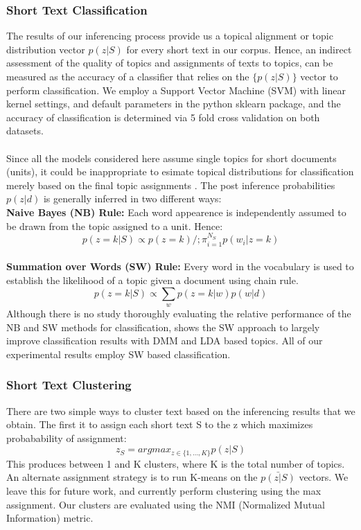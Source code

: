 \documentclass{sig-alternate-05-2015}
\begin{document}
\subsubsection{Short Text Classification} 
The results of our inferencing process provide us a topical alignment or topic distribution vector $p(z|S)$ for every short text in our corpus. Hence, an indirect assessment of the quality of topics and assignments of texts to topics, can be measured as the accuracy of a classifier that relies on the $\{p(z|S)\}$ vector to perform classification. We employ a Support Vector Machine (SVM) with linear kernel settings, and default parameters in the python sklearn package, and the accuracy of classification is determined via 5 fold cross validation on both datasets.
\\
\\
Since all the models considered here assume single topics for short documents (units), it could be inappropriate to esimate topical distributions for classification merely based on the final topic assignments \cite{gpudmm, btm}. The post inference probabilities $p(z|d)$ is generally inferred in two different ways:
\\
\textbf{Naive Bayes (NB) Rule:}
Each word appearence is independently assumed to be drawn from the topic assigned to a unit. Hence:
$$p(z=k |S) \propto p(z=k)/;\pi_{i=1}^{N_{S}}p(w_{i}|z=k)$$
\\
\textbf{Summation over Words (SW) Rule:}
Every word in the vocabulary is used to establish the likelihood of a topic given a document using chain rule.
$$p(z=k |S) \propto \sum_{w}p(z=k|w)p(w|d)$$
Although there is no study thoroughly evaluating the relative performance of the NB and SW methods for classification, \cite{satm} shows the SW approach to largely improve classification results with DMM and LDA based topics. All of our experimental results employ SW based classification.

\subsubsection{Short Text Clustering} 
There are two simple ways to cluster text based on the inferencing results that we obtain. The first it to assign each short text S to the z which maximizes probabability of assignment:
$$z_{S} = argmax_{z \in \{1, ... ,K\}}p(z|S)$$
This produces between 1 and K clusters, where K is the total number of topics. An alternate assignment strategy is to run K-means on the $\bar{p(z|S)}$ vectors. We leave this for future work, and currently perform clustering using the max assignment. Our clusters are evaluated using the NMI (Normalized Mutual Information) metric.
\\
\end{document}
